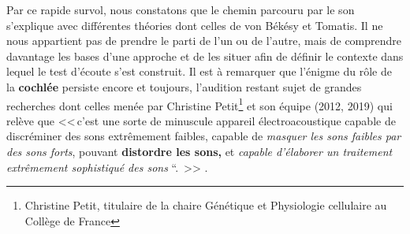 Par ce rapide survol, nous constatons que  le 
chemin 
parcouru par 
le son s'explique avec différentes théories  dont celles de von Békésy et 
Tomatis. Il ne nous appartient pas de prendre le parti de l'un ou de l'autre, mais de comprendre 
davantage les bases d'une approche  et de les situer  afin de définir  le 
contexte dans lequel le test d'écoute s'est construit.
Il est à 
remarquer que l'énigme du 
rôle de la \textbf{cochlée}  persiste encore et toujours, l'audition restant 
sujet de grandes 
recherches dont celles menée par Christine Petit\footnote{Christine Petit, titulaire de la 
	chaire Génétique et
	Physiologie cellulaire au Collège de France} et son équipe (2012, 
2019) %
qui relève que 
<<\,c'est une sorte de minuscule appareil électroacoustique capable
de discréminer des sons extrêmement faibles, capable de \emph{masquer
	les sons faibles par des sons forts}, pouvant \textbf{distordre les
	sons,} et \emph{capable d'élaborer un traitement extrêmement
	sophistiqué des sons} ``. \,>> \autocite{petit_lookscience}.%


